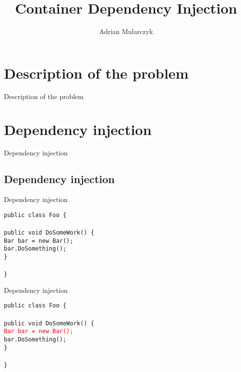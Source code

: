 \documentclass{beamer}
\title[]
{Container Dependency Injection}
\author[Adrian Mularczyk]{Adrian Mularczyk}
\date{}
\newcommand{\code}[1]{{\texttt{#1}}}
\begin{document}
\begin{frame}
  \titlepage 
\end{frame}

\section{Description of the problem}

\begin{frame}{}
	\begin{center}
		\Huge{Description of the problem}
	\end{center}
\end{frame}

\section{Dependency injection}

\begin{frame}{}
	\begin{center}
		\Huge{Dependency injection}
	\end{center}
\end{frame}

\subsection*{Dependency injection}

\begin{frame}{Dependency injection}
     \begin{large}
	\code{public class Foo \{}\\ \quad
	\code{}\\ \quad
		\code{public void DoSomeWork() \{}\\ \qquad
		\code{Bar bar = new Bar();}\\ \qquad
		\code{bar.DoSomething();}\\ \quad
		\code{\}}\\
	\code{}\\
	\code{\}}
     \end{large}
\end{frame}

\begin{frame}{Dependency injection}
     \begin{large}
	\code{public class Foo \{}\\\ \quad
	\code{}\\ \quad
		\code{public void DoSomeWork() \{}\\ \qquad
		\code{\textcolor{red}{Bar bar = new Bar();}}\\ \qquad
		\code{bar.DoSomething();}\\ \quad
		\code{\}}\\
	\code{}\\
	\code{\}}
     \end{large}
\end{frame}
\end{document}
